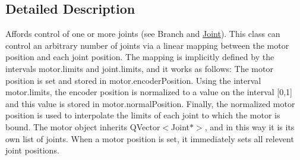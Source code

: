 \subsection{Detailed Description}
Affords control of one or more joints (see Branch and \hyperlink{class_robot_model_1_1_joint}{Joint}). This class can control an arbitrary number of joints via a linear mapping between the motor position and each joint position. The mapping is implicitly defined by the intervals motor.limits and joint.limits, and it works as follows: The motor position is set and stored in motor.encoderPosition. Using the interval motor.limits, the encoder position is normalized to a value on the interval \mbox{[}0,1\mbox{]} and this value is stored in motor.normalPosition. Finally, the normalized motor position is used to interpolate the limits of each joint to which the motor is bound. The motor object inherits QVector$<$Joint$\ast$$>$, and in this way it is its own list of joints. When a motor position is set, it immediately sets all relevent joint positions. 

